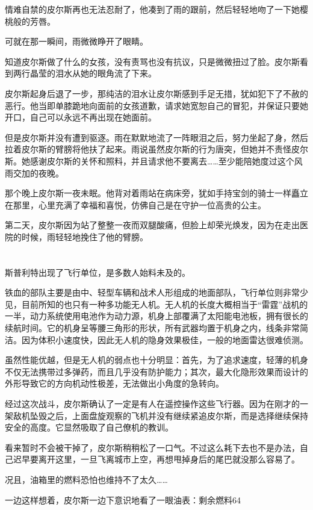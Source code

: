 情难自禁的皮尔斯再也无法忍耐了，他凑到了雨的跟前，然后轻轻地吻了一下她樱桃般的芳唇。

可就在那一瞬间，雨微微睁开了眼睛。

知道皮尔斯做了什么的女孩，没有责骂也没有抗议，只是微微扭过了脸。皮尔斯看到两行晶莹的泪水从她的眼角流了下来。

皮尔斯起身后退了一步，那纯洁的泪水让皮尔斯感到手足无措，犹如犯下了不赦的恶行。他当即单膝跪地向面前的女孩道歉，请求她宽恕自己的冒犯，并保证只要她开口，自己可以永远不再出现在她面前。

但是皮尔斯并没有遭到驱逐。雨在默默地流了一阵眼泪之后，努力坐起了身，然后拉着皮尔斯的臂膀将他扶了起来。雨说虽然皮尔斯的行为唐突，但她并不责怪皮尔斯。她感谢皮尔斯的关怀和照料，并且请求他不要离去……至少能陪她度过这个风雨交加的夜晚。

那个晚上皮尔斯一夜未眠。他背对着雨站在病床旁，犹如手持宝剑的骑士一样矗立在那里，心里充满了幸福和喜悦，仿佛自己是在守护一位高贵的公主。

第二天，皮尔斯因为站了整整一夜而双腿酸痛，但脸上却荣光焕发，因为在走出医院的时候，雨轻轻地挽住了他的臂膀。

\section*{}

斯普利特出现了飞行单位，是多数人始料未及的。

铁血的部队主要是由中、轻型车辆和战术人形组成的地面部队，飞行单位则非常少见，目前所知的也只有一种多功能无人机。无人机的长度大概相当于“雷霆”战机的一半，动力系统使用电池作为动力源，机身上部覆满了太阳能电池板，拥有很长的续航时间。它的机身呈等腰三角形的形状，所有武器均置于机身之内，线条非常简洁。因为体积小速度快，因此无人机的隐身效果极佳，一般的地面雷达很难侦测。

虽然性能优越，但是无人机的弱点也十分明显：首先，为了追求速度，轻薄的机身不仅无法携带过多弹药，而且几乎没有防护能力；其次，最大化隐形效果而设计的外形导致它的方向机动性极差，无法做出小角度的急转向。

经过这次战斗，皮尔斯确认了一定是有人在遥控操作这些飞行器。因为在刚才的一架敌机坠毁之后，上面盘旋观察的飞机并没有继续紧追皮尔斯，而是选择继续保持安全的高度。它显然吸取了自己僚机的教训。

看来暂时不会被干掉了，皮尔斯稍稍松了一口气。不过这么耗下去也不是办法，自己迟早要离开这里，一旦飞离城市上空，再想甩掉身后的尾巴就没那么容易了。

况且，油箱里的燃料恐怕也维持不了太久……

一边这样想着，皮尔斯一边下意识地看了一眼油表：剩余燃料64%

